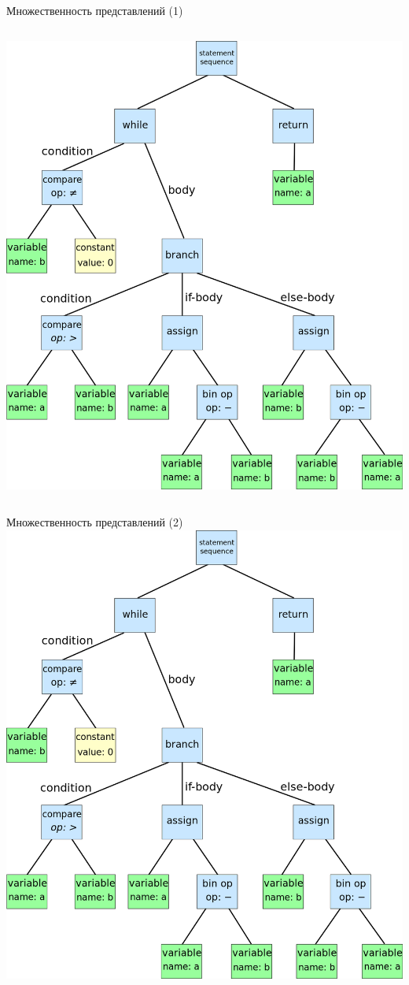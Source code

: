 \documentclass[sans]{beamer}
\begin{document}
\begin{frame}{Множественность представлений (1)}
  \begin{columns}
    \begin{column}{0.65\linewidth}
      \includegraphics[width = \linewidth]{images/ast.png}
    \end{column}
  \end{columns}
\end{frame}

\begin{frame}{Множественность представлений (2)}
  \centering
  \includegraphics[width = 0.2\linewidth]{images/ast.png}
  \begin{columns}
    \begin{column}{0.3\linewidth}
      \inputminted{c}{codes/ast1.c}
    \end{column}
    \begin{column}{0.5\linewidth}
      \inputminted{c}{codes/ast2.c}
    \end{column}
  \end{columns}
\end{frame}
\end{document}
